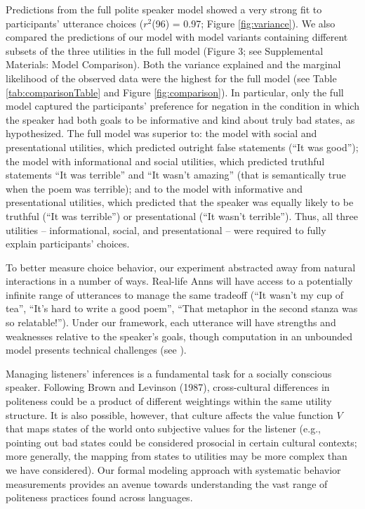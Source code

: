 \documentclass[12pt]{article}
\begin{document}
Predictions from the full polite speaker model showed a very strong fit
to participants' utterance choices (\(r^2\)(96) = 0.97; Figure
\ref{fig:variance}). We also compared the predictions of our model with
model variants containing different subsets of the three utilities in
the full model (Figure 3; see Supplemental Materials: Model Comparison).
Both the variance explained and the marginal likelihood of the observed
data were the highest for the full model (see Table
\ref{tab:comparisonTable} and Figure \ref{fig:comparison}). In
particular, only the full model captured the participants' preference
for negation in the condition in which the speaker had both goals to be
informative and kind about truly bad states, as hypothesized. The full
model was superior to: the model with social and presentational
utilities, which predicted outright false statements (\enquote{It was
good}); the model with informational and social utilities, which
predicted truthful statements \enquote{It was terrible} and \enquote{It
wasn't amazing} (that is semantically true when the poem was terrible);
and to the model with informative and presentational utilities, which
predicted that the speaker was equally likely to be truthful
(\enquote{It was terrible}) or presentational (\enquote{It wasn't
terrible}). Thus, all three
utilities -- informational, social, and presentational -- were required
to fully explain participants' choices.


To better measure choice behavior, our experiment abstracted away from
natural interactions in a number of ways. Real-life Anns will have
access to a potentially infinite range of utterances to manage the same
tradeoff (\enquote{It wasn't my cup of tea}, \enquote{It's hard to write
a good poem}, \enquote{That metaphor in the second stanza was so
relatable!}). Under our framework, each utterance will have strengths
and weaknesses relative to the speaker's goals, though computation in an
unbounded model presents technical challenges (see \cite{goodman2016}).

Managing listeners' inferences is a fundamental task for a socially
conscious speaker. Following Brown and Levinson (1987), cross-cultural
differences in politeness could be a product of different weightings
within the same utility structure. It is also possible, however, that
culture affects the value function \(V\) that maps states of the world
onto subjective values for the listener (e.g., pointing out bad states
could be considered prosocial in certain cultural contexts; more
generally, the mapping from states to utilities may be more complex than
we have considered). Our formal modeling approach with systematic
behavior measurements provides an avenue towards understanding the vast
range of politeness practices found across languages.
\end{document}
